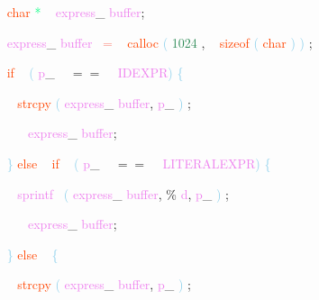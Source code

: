 \documentclass[8, usernames, dvipsnames]{beamer}
\begin{document}
\begin{frame}
\textcolor{White}{\   }
\textcolor{OrangeRed}{char}
\textcolor{SpringGreen}{*}
\textcolor{White}{\ }
\textcolor{Violet}{express}\textcolor{Sepia}{\_}
\textcolor{Violet}{buffer}\textcolor{Sepia}{;}

 \textcolor{White}{\   }
\textcolor{Violet}{express}\textcolor{Sepia}{\_}
\textcolor{Violet}{buffer}\textcolor{White}{\ }
\textcolor{Salmon}{=}
\textcolor{White}{\ }
\textcolor{OrangeRed}{calloc}
\textcolor{SkyBlue}{(}
\textcolor{SeaGreen}{1024}
\textcolor{Sepia}{,}
\textcolor{White}{\ }
\textcolor{OrangeRed}{sizeof}
\textcolor{SkyBlue}{(}
\textcolor{OrangeRed}{char}
\textcolor{SkyBlue}{)}
\textcolor{SkyBlue}{)}
\textcolor{Sepia}{;}

 \textcolor{White}{\   }
\textcolor{OrangeRed}{if}
\textcolor{White}{\ }
\textcolor{SkyBlue}{(}
\textcolor{Violet}{p}\textcolor{Sepia}{\_}
\textcolor{White}{\ }
\textcolor{OliveGreen}{$==$}
\textcolor{White}{\ }
\textcolor{Violet}{IDEXPR}\textcolor{SkyBlue}{)}
\textcolor{SkyBlue}{\{ }

 \textcolor{White}{\   }
\textcolor{White}{\   }
\textcolor{OrangeRed}{strcpy}
\textcolor{SkyBlue}{(}
\textcolor{Violet}{express}\textcolor{Sepia}{\_}
\textcolor{Violet}{buffer}\textcolor{Sepia}{,}
\textcolor{Violet}{p}\textcolor{Sepia}{\_}
\textcolor{SkyBlue}{)}
\textcolor{Sepia}{;}

 \textcolor{White}{\   }
\textcolor{White}{\   }
\textcolor{OrangeRed}{	}
\textcolor{White}{\ }
\textcolor{Violet}{express}\textcolor{Sepia}{\_}
\textcolor{Violet}{buffer}\textcolor{Sepia}{;}

 \textcolor{White}{\   }
\textcolor{SkyBlue}{\} }
\textcolor{OrangeRed}{else}
\textcolor{White}{\ }
\textcolor{OrangeRed}{if}
\textcolor{White}{\ }
\textcolor{SkyBlue}{(}
\textcolor{Violet}{p}\textcolor{Sepia}{\_}
\textcolor{White}{\ }
\textcolor{OliveGreen}{$==$}
\textcolor{White}{\ }
\textcolor{Violet}{LITERALEXPR}\textcolor{SkyBlue}{)}
\textcolor{SkyBlue}{\{ }

 \textcolor{White}{\   }
\textcolor{White}{\   }
\textcolor{Violet}{sprintf}\textcolor{White}{\ }
\textcolor{SkyBlue}{(}
\textcolor{Violet}{express}\textcolor{Sepia}{\_}
\textcolor{Violet}{buffer}\textcolor{Sepia}{,}
\textcolor{Apricot}{\%}
\textcolor{Violet}{d}\textcolor{Sepia}{,}
\textcolor{Violet}{p}\textcolor{Sepia}{\_}
\textcolor{SkyBlue}{)}
\textcolor{Sepia}{;}

 \textcolor{White}{\   }
\textcolor{White}{\   }
\textcolor{OrangeRed}{	}
\textcolor{White}{\ }
\textcolor{Violet}{express}\textcolor{Sepia}{\_}
\textcolor{Violet}{buffer}\textcolor{Sepia}{;}

 \textcolor{White}{\   }
\textcolor{SkyBlue}{\} }
\textcolor{OrangeRed}{else}
\textcolor{White}{\ }
\textcolor{SkyBlue}{\{ }

 \textcolor{White}{\   }
\textcolor{White}{\   }
\textcolor{OrangeRed}{strcpy}
\textcolor{SkyBlue}{(}
\textcolor{Violet}{express}\textcolor{Sepia}{\_}
\textcolor{Violet}{buffer}\textcolor{Sepia}{,}
\textcolor{Violet}{p}\textcolor{Sepia}{\_}
\textcolor{SkyBlue}{)}
\textcolor{Sepia}{;}

 \end{frame}
\end{document}
